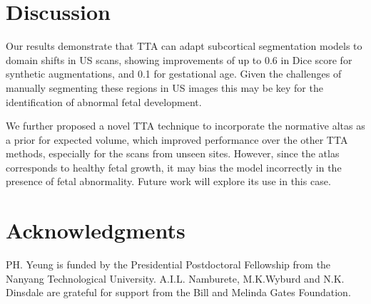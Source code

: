 \documentclass[conference]{IEEEtran}
\begin{document}
\section{Discussion}
Our results demonstrate that TTA can adapt subcortical segmentation models to domain shifts in US scans, showing improvements of up to 0.6 in Dice score for synthetic augmentations, and 0.1 for gestational age. Given the challenges of manually segmenting these regions in US images this may be key for the identification of abnormal fetal development. 

We further proposed a novel TTA technique to incorporate the normative altas \cite{Namburete2023} as a prior for expected volume, which improved performance over the other TTA methods, especially for the scans from unseen sites. However, since the atlas corresponds to healthy fetal growth, it may bias the model incorrectly in the presence of fetal abnormality. Future work will explore its use in this case.  

\section{Acknowledgments}

PH. Yeung is funded by the Presidential Postdoctoral Fellowship from the Nanyang Technological University. A.I.L. Namburete, M.K.Wyburd and N.K. Dinsdale are grateful for support from the Bill and Melinda Gates Foundation.



%
\end{document}
